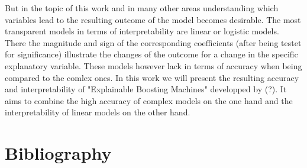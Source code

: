 \documentclass[12pt,titlepage]{article}
\begin{document}
But in the topic of this work and in many other areas understanding which variables lead to the resulting outcome of the model becomes desirable. The most transparent models in terms
of interpretability are linear or logistic models. There the magnitude and sign of the corresponding coefficients (after being testet for significance) illustrate the
changes of the outcome for a change in the specific explanatory variable. These models however lack in terms of accuracy when being compared to the comlex ones. In this work we will
present the resulting accuracy and interpretability of "Explainable Boosting Machines" developped by (?). It aims to combine the high accuracy of complex models on the one hand and the
interpretability of linear models on the other hand. \\

\newpage

\thispagestyle{empty}

\section*{Bibliography}
\vspace*{6mm}
\end{document}
